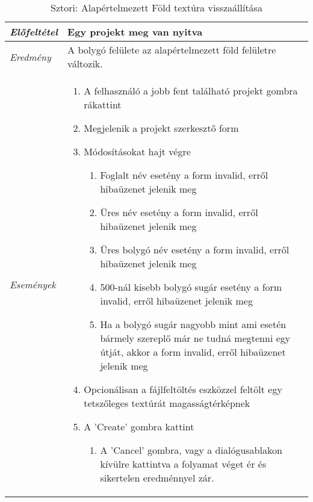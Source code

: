 \begin{table}[H]
	\centering
	\begin{tabular}{ | m{} | m{} | }
		\hline
		\emph{Előfeltétel} & Egy projekt meg van nyitva  \\
		\hline
		\emph{Eredmény} & A bolygó felülete az alapértelmezett föld felületre változik.    \\
		\hline
		\emph{Események} &

		\begin{enumerate}
			\item A felhasználó a jobb fent található projekt gombra rákattint
			\item Megjelenik a projekt szerkesztő form
			\item Módosításokat hajt végre
			\begin{enumerate}
				\item Foglalt név esetény a form invalid, erről hibaüzenet jelenik meg
				\item Üres név esetény a form invalid, erről hibaüzenet jelenik meg
				\item Üres bolygó név esetény a form invalid, erről hibaüzenet jelenik meg
				\item 500-nál kisebb bolygó sugár esetény a form invalid, erről hibaüzenet jelenik meg
				\item Ha a bolygó sugár nagyobb mint ami esetén bármely szereplő már ne tudná megtenni egy útját, akkor a form invalid, erről hibaüzenet jelenik meg
			\end{enumerate}
			\item Opcionálisan a fájlfeltöltés eszközzel feltölt egy tetszőleges textúrát magasságtérképnek
			\item A 'Create' gombra kattint
			\begin{enumerate}
				\item A 'Cancel' gombra, vagy a dialógusablakon kívülre kattintva a folyamat véget ér és sikertelen eredménnyel zár.
			\end{enumerate}
		\end{enumerate}

		\\
		\hline
	\end{tabular}
	\caption{Sztori: Alapértelmezett Föld textúra visszaállítása}
	\label{tab:story-project-edit-earth-texture}
\end{table}
